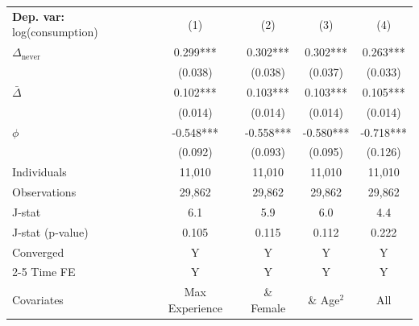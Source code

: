 \begin{tabular}{l cccc} \toprule  \textbf{Dep. var:}  log(consumption) 
                    &\multicolumn{1}{c}{(1)}   &\multicolumn{1}{c}{(2)}   &\multicolumn{1}{c}{(3)}   &\multicolumn{1}{c}{(4)}   \\

\addlinespace
$\Delta_{\text{never}}$&       0.299***&       0.302***&       0.302***&       0.263***\\
                    &     (0.038)   &     (0.038)   &     (0.037)   &     (0.033)   \\

\addlinespace
$\bar{\Delta}$      &       0.102***&       0.103***&       0.103***&       0.105***\\
                    &     (0.014)   &     (0.014)   &     (0.014)   &     (0.014)   \\

\addlinespace
$\phi$              &      -0.548***&      -0.558***&      -0.580***&      -0.718***\\
                    &     (0.092)   &     (0.093)   &     (0.095)   &     (0.126)   \\
\addlinespace
Individuals         &      11,010   &      11,010   &      11,010   &      11,010   \\
Observations        &      29,862   &      29,862   &      29,862   &      29,862   \\
J-stat              &         6.1   &         5.9   &         6.0   &         4.4   \\
J-stat (p-value)    &       0.105   &       0.115   &       0.112   &       0.222   \\
Converged           &           Y   &           Y   &           Y   &           Y   \\
\cmidrule{2-5} Time FE & Y & Y & Y & Y \\ Covariates & Max Experience & \& Female & \& Age$^2$ & All \\ \bottomrule \end{tabular}
